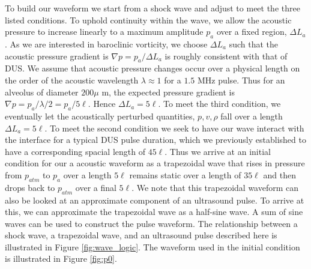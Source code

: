 \documentclass{jfm}%
\begin{document}
To build our waveform we start from a shock wave and adjust to meet
the three listed conditions. To uphold continuity within the wave, we
allow the acoustic pressure to increase linearly to a maximum
amplitude $p_a$ over a fixed region, $\Delta L_a$. As we are
interested in baroclinic vorticity, we choose $\Delta L_a$ such that
the acoustic pressure gradient is $\nabla p=p_a/\Delta L_a$ is roughly
consistent with that of \ac{DUS}. We assume that acoustic pressure
changes occur over a physical length on the order of the acoustic
wavelength $\lambda\approx 1$ for a $1.5$ MHz pulse. Thus for an
alveolus of diameter $200 \mu$ m, the expected pressure gradient is
$\nabla p=p_a/\lambda/2=p_a/5\ell$. Hence $\Delta L_a=5\ell$. To meet
the third condition, we eventually let the acoustically perturbed
quantities, $p, v, \rho$ fall over a length $\Delta L_a=5\ell$. To
meet the second condition we seek to have our wave interact with the
interface for a typical \ac{DUS} pulse duration, which we previously
established to have a corresponding spacial length of $45\ell$. Thus
we arrive at an initial condition for our a acoustic waveform as a
trapezoidal wave that rises in pressure from $p_{atm}$ to $p_a$ over a
length $5\ell$ remains static over a length of $35\ell$ and then drops
back to $p_{atm}$ over a final $5\ell$. We note that this trapezoidal
waveform can also be looked at an approximate component of an
ultrasound pulse. To arrive at this, we can approximate the
trapezoidal wave as a half-sine wave. A sum of sine waves can be used
to construct the pulse waveform. The relationship between a shock
wave, a trapezoidal wave, and an ultrasound pulse described here is
illustrated in Figure \ref{fig:wave_logic}. The waveform used in the
initial condition is illustrated in Figure \ref{fig:p0}.
\end{document}
